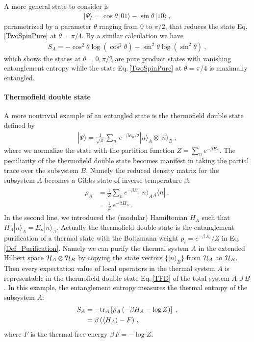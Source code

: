A more general state to consider is
\begin{align}
|\Psi\rangle =  \cos\theta\, |0 1 \rangle - \sin\theta\, |10\rangle \ ,
\end{align}
parametrized by a parameter $\theta$ ranging from $0$ to $\pi/2$, that reduces the state Eq.\,\eqref{TwoSpinPure} at $\theta=\pi /4$.
By a similar calculation we have
\begin{align}
	S_A = - \cos^2 \theta \log ( \cos^2 \theta) - \sin^2\theta \log (\sin^2\theta) \ ,
\end{align}
which shows the states at $\theta = 0, \pi /2$ are pure product states with vanishing entanglement entropy while the state Eq.\,\eqref{TwoSpinPure} at $\theta= \pi/4$ is maximally entangled.


\paragraph{Thermofield double state}
A more nontrivial example of an entangled state is the thermofield double state defined by
\begin{align}\label{TFD}
	| \Psi\rangle = \frac{1}{\sqrt{Z} }\sum_n\,e^{-\beta E_n/2} |n\rangle_A \otimes |n\rangle_B \ ,
\end{align}
where we normalize the state with the partition function $Z = \sum_n e^{-\beta E_n}$.
The peculiarity of the thermofield double state becomes manifest in taking the partial trace over the subsystem $B$.
Namely the reduced density matrix for the subsystem $A$ becomes a Gibbs state of inverse temperature $\beta$:
\begin{align}\label{Gibbs_State}
\begin{aligned}
	\rho_A  &=  \frac{1}{Z} \sum_{n} e^{-\beta E_n} |n\rangle_A {}_A\langle n | \ ,\\
		&= \frac{1}{Z}\, e^{-\beta H_A} \ .
\end{aligned}
\end{align}
In the second line, we introduced the (modular) Hamiltonian $H_A$ such that $H_A |n\rangle_A = E_n |n\rangle_A$.
Actually the thermofield double state is the entanglement purification of a thermal state with the Boltzmann weight $p_i = e^{-\beta\,E_i}/Z$ in Eq.\,\eqref{Def_Purification}.
Namely we can purify the thermal system $A$ in the extended Hilbert space ${\cal H}_A\otimes {\cal H}_B$ by copying the state vectors $\{ |n\rangle_B\}$ from ${\cal H}_A$ to ${\cal H}_B$.
Then every expectation value of local operators in the thermal system $A$ is representable in the thermofield double state Eq.\,\eqref{TFD} of the total system $A\cup B$.
In this example, the entanglement entropy measures the thermal entropy of the subsystem $A$:
\begin{align}
\begin{aligned}
	S_A &= -{\rm tr}_A\left[ \rho_A\, (-\beta H_A - \log Z)\right] \ , \\
		&= \beta \,(\langle H_A \rangle -F)   \ ,
\end{aligned}
\end{align}
where $F$ is the thermal free energy $\beta\, F = - \log Z$.

